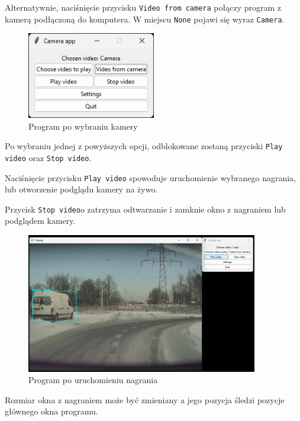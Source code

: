 Alternatywnie, naciśnięcie przycisku \verb|Video from camera| połączy program z kamerą podłączoną do komputera. W miejscu \verb|None| pojawi się wyraz \verb|Camera|.

\begin{figure}[H]
	\centering
	\includegraphics[width=0.5\textwidth]{Img/manual/camera_loaded.png}
	\caption{Program po wybraniu kamery}
	\label{fig:camera_loaded}
\end{figure}

Po wybraniu jednej z powyższych opcji, odblokowane zostaną przyciski \verb|Play video| oraz \verb|Stop video|.

\newpage

Naciśnięcie przycisku \verb|Play video| spowoduje uruchomienie wybranego nagrania, lub otworzenie podglądu kamery na żywo.

Przycisk \verb|Stop video|o zatrzyma odtwarzanie i zamknie okno z nagraniem lub podglądem kamery.

\begin{figure}[H]
	\centering
	\includegraphics[width=0.9\textwidth]{Img/manual/video_playing.png}
	\caption{Program po uruchomieniu nagrania}
	\label{fig:video_playing}
\end{figure}

Rozmiar okna z nagraniem może być zmieniany a jego pozycja śledzi pozycje głównego okna programu.

